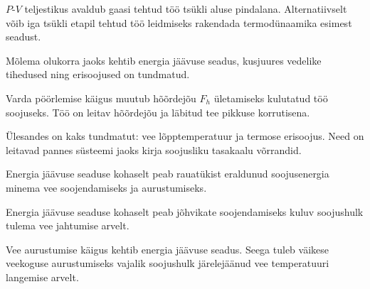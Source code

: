 \documentclass[10pt]{article}
\begin{document}
{
\hint
$P$-$V$ teljestikus avaldub gaasi tehtud töö tsükli aluse pindalana. Alternatiivselt võib iga tsükli etapil tehtud töö leidmiseks rakendada termodünaamika esimest seadust.
\probend
\bigskip


\hint
Mõlema olukorra jaoks kehtib energia jäävuse seadus, kusjuures vedelike tihedused ning erisoojused on tundmatud.
\probend
\bigskip


\hint
Varda pöörlemise käigus muutub hõõrdejõu $F_h$ ületamiseks kulutatud töö soojuseks. Töö on leitav hõõrdejõu ja läbitud tee pikkuse korrutisena.
\probend
\bigskip


\hint
Ülesandes on kaks tundmatut: vee lõpptemperatuur ja termose erisoojus. Need on leitavad pannes süsteemi jaoks kirja soojusliku tasakaalu võrrandid.
\probend
\bigskip


\hint
Energia jäävuse seaduse kohaselt peab rauatükist eraldunud soojusenergia minema vee soojendamiseks ja aurustumiseks.
\probend
\bigskip


\hint
Energia jäävuse seaduse kohaselt peab jõhvikate soojendamiseks kuluv soojushulk tulema vee jahtumise arvelt.
\probend
\bigskip


\hint
Vee aurustumise käigus kehtib energia jäävuse seadus. Seega tuleb väikese veekoguse aurustumiseks vajalik soojushulk järelejäänud vee temperatuuri langemise arvelt.
\probend
\bigskip


}
\end{document}
